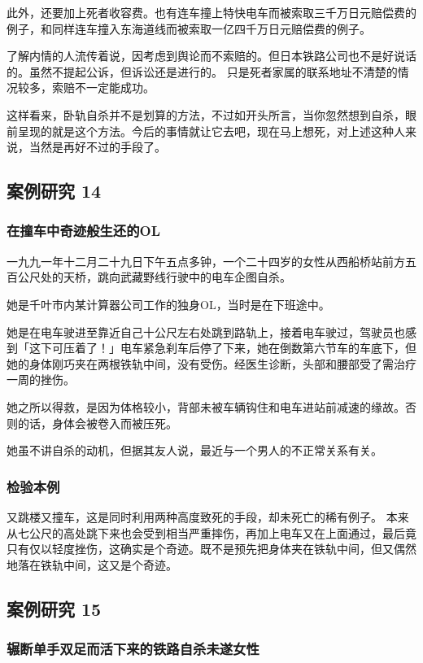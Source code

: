 \documentclass[UTF8]{ctexart}
\begin{document}
此外，还要加上死者收容费。也有连车撞上特快电车而被索取三千万日元赔偿费的例子，和同样连车撞入东海道线而被索取一亿四千万日元赔偿费的例子。

了解内情的人流传着说，因考虑到舆论而不索赔的。但日本铁路公司也不是好说话的。虽然不提起公诉，但诉讼还是进行的。 只是死者家属的联系地址不清楚的情况较多，索赔不一定能成功。 

这样看来，卧轨自杀并不是划算的方法，不过如开头所言，当你忽然想到自杀，眼前呈现的就是这个方法。今后的事情就让它去吧，现在马上想死，对上述这种人来说，当然是再好不过的手段了。

\subsection{案例研究 14}

\subsubsection*{在撞车中奇迹般生还的OL}

一九九一年十二月二十九日下午五点多钟，一个二十四岁的女性从西船桥站前方五百公尺处的天桥，跳向武藏野线行驶中的电车企图自杀。

她是千叶市内某计算器公司工作的独身OL，当时是在下班途中。

她是在电车驶进至靠近自己十公尺左右处跳到路轨上，接着电车驶过，驾驶员也感到「这下可压着了！」电车紧急刹车后停了下来，她在倒数第六节车的车底下，但她的身体刚巧夹在两根铁轨中间，没有受伤。经医生诊断，头部和腰部受了需治疗一周的挫伤。

她之所以得救，是因为体格较小，背部未被车辆钩住和电车进站前减速的缘故。否则的话，身体会被卷入而被压死。

她虽不讲自杀的动机，但据其友人说，最近与一个男人的不正常关系有关。

\subsubsection*{检验本例}

又跳楼又撞车，这是同时利用两种高度致死的手段，却未死亡的稀有例子。
本来从七公尺的高处跳下来也会受到相当严重摔伤，再加上电车又在上面通过，最后竟只有仅以轻度挫伤，这确实是个奇迹。既不是预先把身体夹在铁轨中间，但又偶然地落在铁轨中间，这又是个奇迹。


\subsection{案例研究 15}

\subsubsection*{辗断单手双足而活下来的铁路自杀未遂女性}
\end{document}
